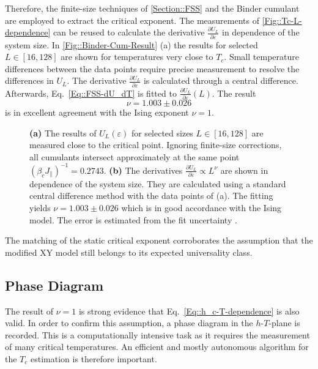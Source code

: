 	Therefore, the finite-size techniques of \autoref{Section::FSS} and the Binder cumulant are employed to extract the critical exponent. The measurements of \autoref{Fig::Tc-L-dependence} can be reused to calculate the derivative $\tfrac{\partial U_L}{\partial \varepsilon}$ in dependence of the system size.
	In \autoref{Fig::Binder-Cum-Result} (a) the results for selected $L \in \left[16, 128\right]$ are shown for temperatures very close to $T_c$. Small temperature differences between the data points require precise measurement to resolve the differences in $U_L$. The derivative $\tfrac{\partial U_L}{\partial \varepsilon}$ is calculated through a central difference. Afterwards, Eq.~\eqref{Eq::FSS-dU_dT} is fitted to $\tfrac{\partial U_L}{\partial \varepsilon} (L)$. The result 
	\begin{equation}
		\nu =	1.003 \pm 0.026
	\end{equation}
	 is in excellent agreement with the Ising exponent $\nu =	1$.
	\begin{figure}[tbh]
		\begin{subfigure}{0.475\textwidth}
			\centering
			
		\end{subfigure}
		\begin{subfigure}{0.475\textwidth}
			\centering
			
		\end{subfigure}
		\caption{\textbf{(a)} The results of ${U}_L(\varepsilon)$ for selected sizes $L \in \left[16, 128\right]$ are measured close to the critical point. Ignoring finite-size corrections, all cumulants intersect approximately at the same point $(\beta_c J_\parallel)^{-1} = 0.2743$. \textbf{(b)} The derivatives $\frac{\partial U_L}{\partial \varepsilon} \propto L^\nu$ are shown in dependence of the system size. They are calculated using a standard central difference method with the data points of (a). The fitting yields $\nu = 1.003 \pm 0.026$ which is in good accordance with the Ising model. The error is estimated from the fit uncertainty \cite{vugrin2007confidence}.}
		\label{Fig::Binder-Cum-Result}
	\end{figure}
	The matching of the static critical exponent corroborates the assumption that the modified XY model still belongs to its expected universality class. \\

	
	\subsection{Phase Diagram} \label{Section::Phase-Diagram}
	The result of $\nu = 1$ is strong evidence that Eq.~\eqref{Eq::h_c-T-dependence} is also valid. In order to confirm this assumption, a phase diagram in the $h$-$T$-plane is recorded. This is a computationally intensive task as it requires the measurement of many critical temperatures. An efficient and mostly autonomous algorithm for the $T_c$ estimation is therefore important.
	
